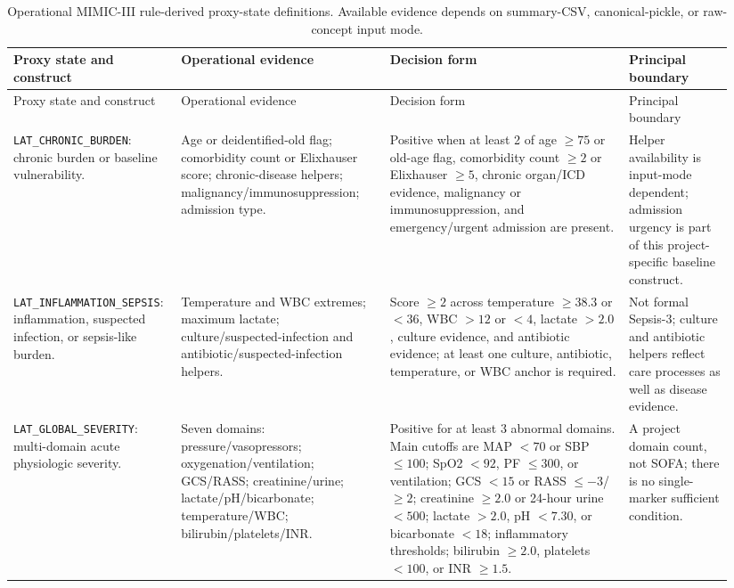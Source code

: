 \begin{landscape}
\begingroup
\small
\singlespacing
\sloppy
\setlength{\tabcolsep}{3pt}
\begin{longtable}{@{}L{0.19\linewidth}L{0.29\linewidth}L{0.32\linewidth}L{0.14\linewidth}@{}}
\caption[MIMIC-III rule-derived proxy-state definitions.]{Operational MIMIC-III rule-derived proxy-state definitions.  Available evidence depends on summary-CSV, canonical-pickle, or raw-concept input mode.}
\label{tab:mimic-proxy-definitions}\\
\toprule
Proxy state and construct & Operational evidence & Decision form & Principal boundary \\
\midrule
\endfirsthead
\toprule
Proxy state and construct & Operational evidence & Decision form & Principal boundary \\
\midrule
\endhead
\bottomrule
\endfoot
\nolinkurl{LAT_CHRONIC_BURDEN}: chronic burden or baseline vulnerability. & Age or deidentified-old flag; comorbidity count or Elixhauser score; chronic-disease helpers; malignancy/immunosuppression; admission type. & Positive when at least 2 of age $\ge 75$ or old-age flag, comorbidity count $\ge 2$ or Elixhauser $\ge 5$, chronic organ/ICD evidence, malignancy or immunosuppression, and emergency/urgent admission are present. & Helper availability is input-mode dependent; admission urgency is part of this project-specific baseline construct. \\
\nolinkurl{LAT_INFLAMMATION_SEPSIS}: inflammation, suspected infection, or sepsis-like burden. & Temperature and WBC extremes; maximum lactate; culture/suspected-infection and antibiotic/suspected-infection helpers. & Score $\ge 2$ across temperature $\ge 38.3$ or $<36$, WBC $>12$ or $<4$, lactate $>2.0$, culture evidence, and antibiotic evidence; at least one culture, antibiotic, temperature, or WBC anchor is required. & Not formal Sepsis-3; culture and antibiotic helpers reflect care processes as well as disease evidence. \\
\nolinkurl{LAT_GLOBAL_SEVERITY}: multi-domain acute physiologic severity. & Seven domains: pressure/vasopressors; oxygenation/ventilation; GCS/RASS; creatinine/urine; lactate/pH/bicarbonate; temperature/WBC; bilirubin/platelets/INR. & Positive for at least 3 abnormal domains.  Main cutoffs are MAP $<70$ or SBP $\le 100$; SpO2 $<92$, PF $\le 300$, or ventilation; GCS $<15$ or RASS $\le -3$/$\ge 2$; creatinine $\ge 2.0$ or 24-hour urine $<500$; lactate $>2.0$, pH $<7.30$, or bicarbonate $<18$; inflammatory thresholds; bilirubin $\ge 2.0$, platelets $<100$, or INR $\ge 1.5$. & A project domain count, not SOFA; there is no single-marker sufficient condition. \\

\end{longtable}
\end{landscape}
